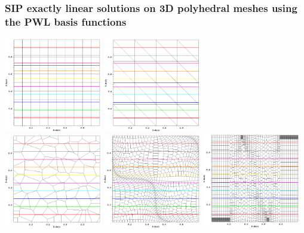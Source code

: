 \documentclass[compress,10pt]{beamer}
\begin{document}
\subsection{}
\begin{frame}[t]\frametitle{SIP exactly linear solutions on 3D polyhedral meshes using the PWL basis functions}
\centering
\includegraphics[width=0.32\textwidth]{images/cart_lin_contour.png} 
\includegraphics[width=0.32\textwidth]{images/tri_lin_contour.png} \\
\vspace{0.2cm}
\includegraphics[width=0.32\textwidth]{images/poly_lin_contour.png} 
\includegraphics[width=0.32\textwidth]{images/sine_poly_lin_contour.png} 
\includegraphics[width=0.32\textwidth]{images/z_poly_lin_contour.png} 
\end{frame}
\end{document}
